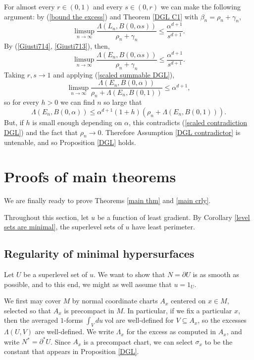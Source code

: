 \documentclass[reqno,12pt,letterpaper]{amsart}
\newcommand{\vol}{\mathrm{vol}}
\theoremstyle{definition}
\numberwithin{equation}{section}
\begin{document}
For almost every $r \in (0, 1)$ and every $s \in (0, r)$ we can make the following argument: by (\ref{bound the excess}) and Theorem \ref{DGL C1} with $\beta_n = \rho_n + \gamma_n$,
$$\limsup_{n \to \infty} \frac{\Lambda(L_n, B(0, \alpha s))}{\rho_n + \gamma_n} \leq \frac{\alpha^{d + 1}}{s^{d + 1}}.$$
By (\ref{Giusti714}, \ref{Giusti713}), then,
$$\limsup_{n \to \infty} \frac{\Lambda(E_n, B(0, \alpha s))}{\rho_n + \gamma_n} \leq \frac{\alpha^{d + 1}}{s^{d + 1}}.$$
Taking $r, s \to 1$ and applying (\ref{scaled summable DGL}),
$$\limsup_{n \to \infty} \frac{\Lambda(E_n, B(0, \alpha))}{\rho_n + \Lambda(E_n, B(0, 1))} \leq \alpha^{d + 1},$$
so for every $h > 0$ we can find $n$ so large that
$$\Lambda(E_n, B(0, \alpha)) \leq \alpha^{d + 1}(1 + h)(\rho_n + \Lambda(E_n, B(0, 1))).$$
But, if $h$ is small enough depending on $\alpha$, this contradicts (\ref{scaled contradiction DGL}) and the fact that $\rho_n \to 0$.
Therefore Assumption \ref{DGL contradictor} is untenable, and so Proposition \ref{DGL} holds.

\section{Proofs of main theorems}\label{proof of main thm}
We are finally ready to prove Theorems \ref{main thm} and \ref{main crly}.

Throughout this section, let $u$ be a function of least gradient.
By Corollary \ref{level sets are minimal}, the superlevel sets of $u$ have least perimeter.

\subsection{Regularity of minimal hypersurfaces}
Let $U$ be a superlevel set of $u$.
We want to show that $N = \partial U$ is as smooth as possible, and to this end, we might as well assume that $u = 1_U$.

We first may cover $M$ by normal coordinate charts $A_x$ centered on $x \in M$, selected so that $A_x$ is precompact in $M$.
In particular, if we fix a particular $x$, then the averaged $1$-forms $\int_V du ~\vol$ are well-defined for $V \subseteq A_x$, so the excesses $\Lambda(U, V)$ are well-defined.
We write $\Lambda_x$ for the excess as computed in $A_x$, and write $N^* = \partial^* U$.
Since $A_x$ is a precompact chart, we can select $\sigma_x$ to be the constant that appears in Proposition \ref{DGL}.
\end{document}
